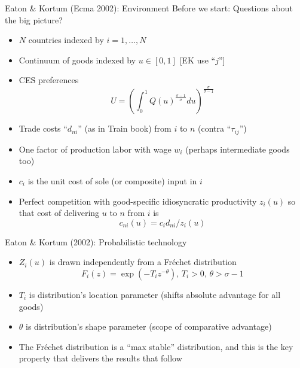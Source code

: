 \documentclass[10pt,notes=hide]{beamer}
\begin{document}
\begin{frame}{Eaton \& Kortum (Ecma 2002): Environment}
Before we start: Questions about the big picture?
\begin{itemize}
	\item $N$ countries indexed by $i=1,\dots,N$
	\item Continuum of goods indexed by $u \in [0,1]$ [EK use ``$j$'']
	\item CES preferences
	\begin{equation*}
	U=\left( \int_{0}^{1}Q(u) ^{\frac{\sigma -1}{\sigma }}du\right)
	^{\frac{\sigma }{\sigma -1}}
	\end{equation*}
	\item Trade costs ``$d_{ni}$'' (as in Train book) from $i$ to $n$ (contra ``$\tau_{ij}$'')
	\item One factor of production labor with wage $w_i$ (perhaps intermediate goods too)
	\item $c_i$ is the unit cost of sole (or composite) input in $i$
	\item Perfect competition with good-specific idiosyncratic productivity $z_i(u)$ so that cost of delivering $u$ to $n$ from $i$ is 
	\begin{equation*}c_{ni}(u) = c_i d_{ni} / z_i(u)\end{equation*}
\end{itemize}
\end{frame}
\begin{frame}{Eaton \& Kortum (2002): Probabilistic technology}
\begin{itemize}
	\item $Z_i(u)$ is drawn independently from a Fr\'{e}chet distribution
	\begin{equation*}
	F_{i}\left( z\right) =\exp \left( -T_{i}z^{-\theta }\right) \text{, \ \ \ \ }%
	T_{i}>0\text{, } \theta>\sigma-1
	\end{equation*}
	\item $T_i$ is distribution's location parameter (shifts absolute advantage for all goods)
	\item $\theta$ is distribution's shape parameter (scope of comparative advantage)
	\item The Fr\'{e}chet distribution is a ``max stable'' distribution, and this is the key property that delivers the results that follow
\end{itemize}
\end{frame}
\end{document}
